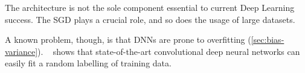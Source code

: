 The architecture is not the sole component essential to current Deep Learning success. The \ac{SGD} plays a crucial role, and so does the usage of large datasets.

A known problem, though, is that DNNs are prone to overfitting (\cref{sec:bias-variance}). ~\citeauthor{zhang:2016} shows that state-of-the-art convolutional deep neural networks can easily fit a random labelling of training data.
